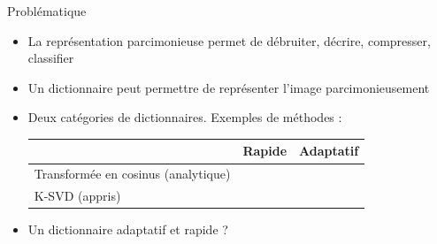 \begin{frame}{Problématique}
\begin{itemize}
\item La \alert{représentation parcimonieuse} permet de débruiter, décrire, compresser, classifier
\item Un dictionnaire peut permettre de représenter l'image parcimonieusement
\item Deux catégories de dictionnaires. Exemples de méthodes :
\begin{table}[] \centering
\begin{tabular}{@{}lcc@{}}
\toprule
 & Rapide & Adaptatif \\ \midrule
Transformée en cosinus (analytique) & \Geq{\cmark} & \Req{\xmark}\\
K-SVD (appris) & \Req{\xmark} & \Geq{\cmark} \\ \bottomrule
\end{tabular}
\end{table}
\item Un dictionnaire \alert{adaptatif et rapide} ?
\end{itemize}
\end{frame}




